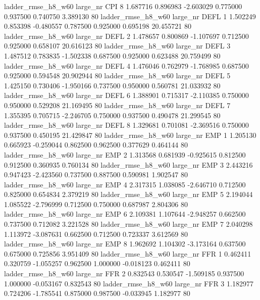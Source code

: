  ladder_rmse_h8_w60   large_nr      CPI                 8  1.687716  0.896983  -2.603029 0.775000 0.937500  0.740750    3.389130 80
 ladder_rmse_h8_w60   large_nr     DEFL                 1  1.502249  0.853398  -0.480557 0.787500 0.925000  0.695198   20.455721 80
 ladder_rmse_h8_w60   large_nr     DEFL                 2  1.478657  0.800869  -1.107697 0.712500 0.925000  0.658107   20.616123 80
 ladder_rmse_h8_w60   large_nr     DEFL                 3  1.487512  0.783835  -1.502338 0.687500 0.925000  0.623488   20.759499 80
 ladder_rmse_h8_w60   large_nr     DEFL                 4  1.476046  0.762979  -1.768985 0.687500 0.925000  0.594548   20.902944 80
 ladder_rmse_h8_w60   large_nr     DEFL                 5  1.425150  0.730406  -1.950166 0.737500 0.950000  0.560781   21.033932 80
 ladder_rmse_h8_w60   large_nr     DEFL                 6  1.388901  0.715317  -2.110385 0.750000 0.950000  0.529208   21.169495 80
 ladder_rmse_h8_w60   large_nr     DEFL                 7  1.355395  0.705715  -2.246705 0.750000 0.937500  0.490478   21.299545 80
 ladder_rmse_h8_w60   large_nr     DEFL                 8  1.329681  0.701081  -2.369516 0.750000 0.937500  0.450195   21.429847 80
 ladder_rmse_h8_w60   large_nr      EMP                 1  1.205130  0.665923  -0.259044 0.862500 0.962500  0.377629    0.464144 80
 ladder_rmse_h8_w60   large_nr      EMP                 2  1.313568  0.681939  -0.925615 0.812500 0.912500  0.360935    0.760134 80
 ladder_rmse_h8_w60   large_nr      EMP                 3  2.443216  0.947423  -2.423560 0.737500 0.887500  0.590981    1.902547 80
 ladder_rmse_h8_w60   large_nr      EMP                 4  2.317315  1.038085  -2.646710 0.712500 0.825000  0.654834    2.379219 80
 ladder_rmse_h8_w60   large_nr      EMP                 5  2.194044  1.085522  -2.796999 0.712500 0.750000  0.687987    2.804306 80
 ladder_rmse_h8_w60   large_nr      EMP                 6  2.109381  1.107644  -2.948257 0.662500 0.737500  0.712082    3.221528 80
 ladder_rmse_h8_w60   large_nr      EMP                 7  2.040298  1.113972  -3.087631 0.662500 0.712500  0.723337    3.612569 80
 ladder_rmse_h8_w60   large_nr      EMP                 8  1.962692  1.104302  -3.173164 0.637500 0.675000  0.725856    3.951409 80
 ladder_rmse_h8_w60   large_nr      FFR                 1  0.462411  0.320759  -1.055257 0.962500 1.000000 -0.018123    0.462411 80
 ladder_rmse_h8_w60   large_nr      FFR                 2  0.832543  0.530547  -1.509185 0.937500 1.000000 -0.053167    0.832543 80
 ladder_rmse_h8_w60   large_nr      FFR                 3  1.182977  0.724206  -1.785541 0.875000 0.987500 -0.033945    1.182977 80
